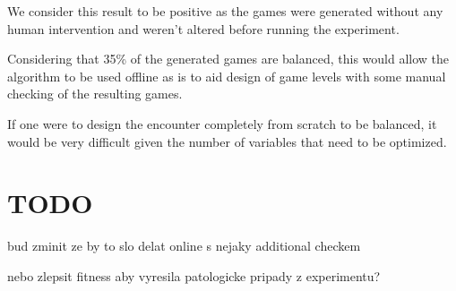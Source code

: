 We consider this result to be positive as the games were generated without
any human intervention and weren't altered before running the experiment.

Considering that 35\% of the generated games are balanced, this would allow
the algorithm to be used offline as is to aid design of game levels with
some manual checking of the resulting games.

If one were to design the encounter completely from scratch to be balanced,
it would be very difficult given the number of variables that need to be
optimized.

\section{TODO}

\begin{description}[align=right,labelwidth=3cm]
\item bud zminit ze by to slo delat online s nejaky additional checkem
\item nebo zlepsit fitness aby vyresila patologicke pripady z experimentu?
\end{description}

